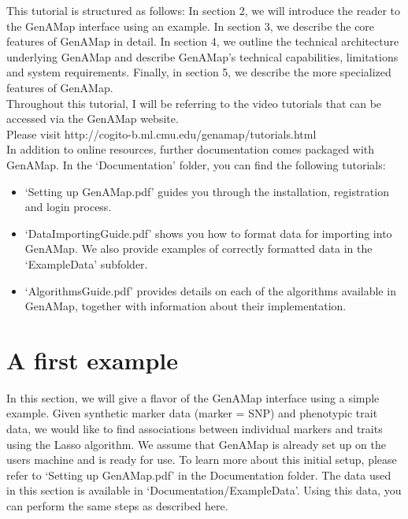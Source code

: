 \documentclass[12pt]{article}
\begin{document}
This tutorial is structured as follows: In section 2, we will introduce the reader to the GenAMap interface using an example. In section 3, we describe the core features of GenAMap in detail. In section 4, we outline the technical architecture underlying GenAMap and describe GenAMap's technical capabilities, limitations and system requirements. Finally, in section 5, we describe the more specialized features of GenAMap.\\

Throughout this tutorial, I will be referring to the video tutorials that can be accessed via the GenAMap website. \\

Please visit http://cogito-b.ml.cmu.edu/genamap/tutorials.html\\

In addition to online resources, further documentation comes packaged with GenAMap. In the `Documentation' folder, you can find the following tutorials:

\begin{itemize}
\item `Setting up GenAMap.pdf' guides you through the installation, registration and login process.
\item `DataImportingGuide.pdf' shows you how to format data for importing into GenAMap. We also provide examples of correctly formatted data in the `ExampleData' subfolder.
\item `AlgorithmsGuide.pdf' provides details on each of the algorithms available in GenAMap, together with information about their implementation.
\end{itemize}

\section{A first example}

In this section, we will give a flavor of the GenAMap interface using a simple example. Given synthetic marker data (marker = SNP) and phenotypic trait data, we would like to find associations between individual markers and traits using the Lasso algorithm. We assume that GenAMap is already set up on the users machine and is ready for use. To learn more about this initial setup, please refer to `Setting up GenAMap.pdf' in the Documentation folder. The data used in this section is available in `Documentation/ExampleData'. Using this data, you can perform the same steps as described here.\\
\end{document}
